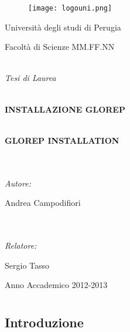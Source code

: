 \documentclass[a4paper,11pt,openany]{book}
\begin{document}
\thispagestyle{empty}
\begin{figure}[!t]
\centering
\texttt{[image: logouni.png]}
\end{figure}
\begin{center}
\LARGE Universit\`{a} degli studi di Perugia

\LARGE Facolt\`{a} di Scienze MM.FF.NN
\end{center}
\begin{center}
\textit{\\Tesi di Laurea}
\end{center}
\begin{center}
\textbf{\LARGE \\INSTALLAZIONE GLOREP}
\end{center}
\begin{center}
\textbf{\LARGE \\GLOREP INSTALLATION}
\end{center}
\begin{minipage}{100mm\textwidth}
\textit{\\\\\Large Autore:}

\Large Andrea Campodifiori
\end{minipage}
\vspace{40mm}
\begin{minipage}{100mm\textwidth}
\textit{\\\\\Large Relatore:}

\Large Sergio Tasso
\end{minipage}
\begin{center}
\small Anno Accademico 2012-2013
\end{center}
\tableofcontents
\setcounter{page}{1}
\chapter{}
\section{Introduzione}

\chapter{}
\section{}
\chapter{}
\chapter{}
\chapter{}
\chapter{}
\chapter{}
\end{document}
